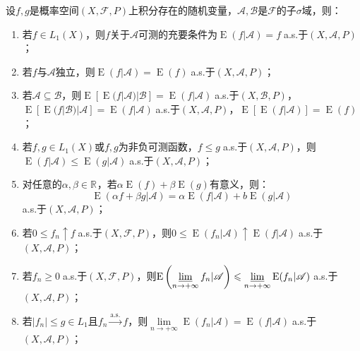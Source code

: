 \begin{property}\label{prop:ConditionalExpectation}
	设$f,g$是概率空间$(X,\mathscr{F},P)$上积分存在的随机变量，$\mathscr{A},\mathscr{B}$是$\mathscr{F}$的子$\sigma$域，则：
	\begin{enumerate}
		\item 若$f\in L_1(X)$，则$f$关于$\mathscr{A}$可测的充要条件为$\operatorname{E}(f|\mathscr{A})=f\;$a.s.于$(X,\mathscr{A},P)$；
		\item 若$f$与$\mathscr{A}$独立，则$\operatorname{E}(f|\mathscr{A})=\operatorname{E}(f)\;$a.s.于$(X,\mathscr{A},P)$；
		\item 若$\mathscr{A}\subseteq\mathscr{B}$，则$\operatorname{E}[\operatorname{E}(f|\mathscr{A})|\mathscr{B}]=\operatorname{E}(f|\mathscr{A})\;$a.s.于$(X,\mathscr{B},P)$，$\operatorname{E}[\operatorname{E}(f|\mathscr{B})|\mathscr{A}]=\operatorname{E}(f|\mathscr{A})\;$a.s.于$(X,\mathscr{A},P)$，$\operatorname{E}[\operatorname{E}(f|\mathscr{A})]=\operatorname{E}(f)$；
 		\item 若$f,g\in L_1(X)$或$f,g$为非负可测函数，$f\leqslant g\;$a.s.于$(X,\mathscr{A},P)$，则$\operatorname{E}(f|\mathscr{A})\leqslant\operatorname{E}(g|\mathscr{A})\;$a.s.于$(X,\mathscr{A},P)$；
		\item 对任意的$\alpha,\beta\in\mathbb{R}^{}$，若$\alpha\operatorname{E}(f)+\beta\operatorname{E}(g)$有意义，则：
		\begin{equation*}
			\operatorname{E}(\alpha f+\beta g|\mathscr{A})=\alpha\operatorname{E}(f|\mathscr{A})+b\operatorname{E}(g|\mathscr{A})
		\end{equation*}
		a.s.于$(X,\mathscr{A},P)$；
		\item 若$0\leqslant f_n\uparrow f\;$a.s.于$(X,\mathscr{F},P)$，则$0\leqslant\operatorname{E}(f_n|\mathscr{A})\uparrow \operatorname{E}(f|\mathscr{A})\;$a.s.于$(X,\mathscr{A},P)$；
		\item 若$f_n\geqslant0\;$a.s.于$(X,\mathscr{F},P)$，则$\operatorname{E}\left(\varliminf\limits_{n\to+\infty}f_n|\mathscr{A}\right)\leqslant\varliminf\limits_{n\to+\infty}\operatorname{E}(f_n|\mathscr{A})\;$a.s.于$(X,\mathscr{A},P)$；
		\item 若$|f_n|\leqslant g\in L_1$且$f_n\overset{\text{a.s.}}{\longrightarrow}f$，则$\lim\limits_{n\to+\infty}\operatorname{E}(f_n|\mathscr{A})=\operatorname{E}(f|\mathscr{A})\;$a.s.于$(X,\mathscr{A},P)$；
	\end{enumerate}
\end{property}
